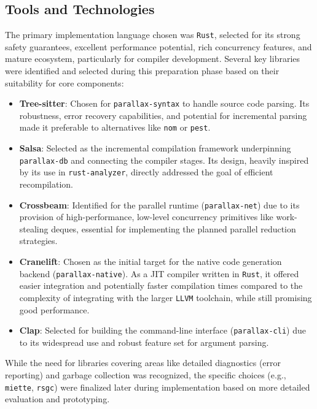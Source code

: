 \subsection{Tools and Technologies}
The primary implementation language chosen was \texttt{Rust}, selected for its strong safety guarantees, excellent performance potential, rich concurrency features, and mature ecosystem, particularly for compiler development. Several key libraries were identified and selected during this preparation phase based on their suitability for core components:
\begin{itemize}
    \item \textbf{Tree-sitter}: Chosen for \texttt{parallax-syntax} to handle source code parsing. Its robustness, error recovery capabilities, and potential for incremental parsing made it preferable to alternatives like \texttt{nom} or \texttt{pest}.
    \item \textbf{Salsa}: Selected as the incremental compilation framework underpinning \texttt{parallax-db} and connecting the compiler stages. Its design, heavily inspired by its use in \texttt{rust-analyzer}, directly addressed the goal of efficient recompilation.
    \item \textbf{Crossbeam}: Identified for the parallel runtime (\texttt{parallax-net}) due to its provision of high-performance, low-level concurrency primitives like work-stealing deques, essential for implementing the planned parallel reduction strategies.
    \item \textbf{Cranelift}: Chosen as the initial target for the native code generation backend (\texttt{parallax-native}). As a JIT compiler written in \texttt{Rust}, it offered easier integration and potentially faster compilation times compared to the complexity of integrating with the larger \texttt{LLVM} toolchain, while still promising good performance.
    \item \textbf{Clap}: Selected for building the command-line interface (\texttt{parallax-cli}) due to its widespread use and robust feature set for argument parsing.
\end{itemize}
While the need for libraries covering areas like detailed diagnostics (error reporting) and garbage collection was recognized, the specific choices (e.g., \texttt{miette}, \texttt{rsgc}) were finalized later during implementation based on more detailed evaluation and prototyping.

